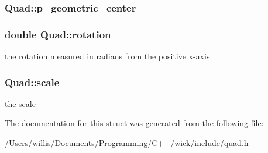 \hypertarget{struct_quad_a7920053596641e39e67eb5c54fc2e8c2}{
\subsubsection[{p\-\_\-geometric\-\_\-center}]{ Quad\-::p\-\_\-geometric\-\_\-center}}\label{struct_quad_a7920053596641e39e67eb5c54fc2e8c2}
\hypertarget{struct_quad_aca4a565629031a148e2ae8f92944f59b}{
\subsubsection[{rotation}]{\setlength{\rightskip}{0pt plus 5cm}double Quad\-::rotation}}\label{struct_quad_aca4a565629031a148e2ae8f92944f59b}
the rotation measured in radians from the positive x-\/axis \hypertarget{struct_quad_adad2b89c97a458d7d99b76e813bf2a99}{
\subsubsection[{scale}]{ Quad\-::scale}}\label{struct_quad_adad2b89c97a458d7d99b76e813bf2a99}
the scale 

The documentation for this struct was generated from the following file\-:\begin{DoxyCompactItemize}
\item 
/\-Users/willis/\-Documents/\-Programming/\-C++/wick/include/\hyperlink{quad_8h}{quad.\-h}\end{DoxyCompactItemize}

